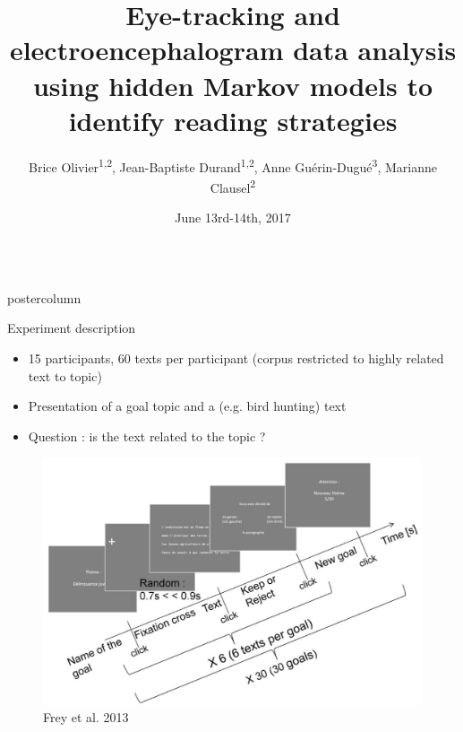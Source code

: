 \documentclass[final,hyperref={pdfpagelabels=false}]{beamer}
\title{Eye-tracking and electroencephalogram data analysis using hidden Markov models to identify reading strategies}
\author{Brice Olivier\textsuperscript{1,2}, Jean-Baptiste Durand\textsuperscript{1,2}, Anne Guérin-Dugué\textsuperscript{3}, Marianne Clausel\textsuperscript{2}}
\institute{\textsuperscript{1}Inria, \textsuperscript{2}Laboratoire Jean Kuntzmann, \textsuperscript{3}Gipsa-lab}
\date[June 13rd-14th, 2017]{June 13rd-14th, 2017}
\newlength{\columnheight}
\begin{document}
\begin{frame}
  \begin{columns}
    \begin{column}{.49\textwidth}
      \begin{beamercolorbox}[center,wd=\textwidth]{postercolumn}
        \begin{minipage}[T]{.95\textwidth}  %
          \parbox[t][\columnheight]{\textwidth}{ %
            \begin{block}{Experiment description}
                \begin{itemize}
                    \item 15 participants, 60 texts per participant (corpus restricted to highly related text to topic)
                    \item Presentation of a goal topic and a (e.g. bird hunting) text
                    \item Question : is the text related to the topic ?
                \end{itemize}

                \begin{figure}[h]
                    \centering
                    \includegraphics[width=35cm]{experiment_description.jpg}
                    \caption{Frey et al. 2013}
                \end{figure}


\end{block}}
\end{minipage}
\end{beamercolorbox}
\end{column}
\end{columns}
\end{frame}
\end{document}
